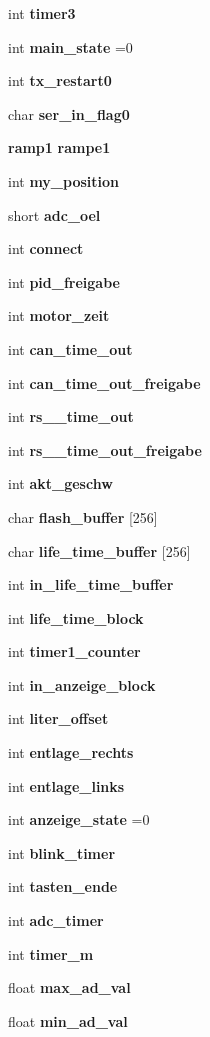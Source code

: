 \begin{DoxyCompactItemize}
\item 
int \textbf{ timer3}
\item 
int \textbf{ main\+\_\+state} =0
\item 
int \textbf{ tx\+\_\+restart0}
\item 
char \textbf{ ser\+\_\+in\+\_\+flag0}
\item 
\textbf{ ramp1} \textbf{ rampe1}
\item 
int \textbf{ my\+\_\+position}
\item 
short \textbf{ adc\+\_\+oel}
\item 
int \textbf{ connect}
\item 
int \textbf{ pid\+\_\+freigabe}
\item 
int \textbf{ motor\+\_\+zeit}
\item 
int \textbf{ can\+\_\+time\+\_\+out}
\item 
int \textbf{ can\+\_\+time\+\_\+out\+\_\+freigabe}
\item 
int \textbf{ rs\+\_\+\_\+time\+\_\+out}
\item 
int \textbf{ rs\+\_\+\_\+time\+\_\+out\+\_\+freigabe}
\item 
int \textbf{ akt\+\_\+geschw}
\item 
char \textbf{ flash\+\_\+buffer} [256]
\item 
char \textbf{ life\+\_\+time\+\_\+buffer} [256]
\item 
int \textbf{ in\+\_\+life\+\_\+time\+\_\+buffer}
\item 
int \textbf{ life\+\_\+time\+\_\+block}
\item 
int \textbf{ timer1\+\_\+counter}
\item 
int \textbf{ in\+\_\+anzeige\+\_\+block}
\item 
int \textbf{ liter\+\_\+offset}
\item 
int \textbf{ entlage\+\_\+rechts}
\item 
int \textbf{ entlage\+\_\+links}
\item 
int \textbf{ anzeige\+\_\+state} =0
\item 
int \textbf{ blink\+\_\+timer}
\item 
int \textbf{ tasten\+\_\+ende}
\item 
int \textbf{ adc\+\_\+timer}
\item 
int \textbf{ timer\+\_\+m}
\item 
float \textbf{ max\+\_\+ad\+\_\+val}
\item 
float \textbf{ min\+\_\+ad\+\_\+val}
\end{DoxyCompactItemize}


